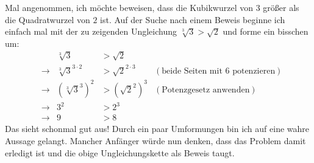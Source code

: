 \begin{bem} \label{hintennachvorne}
    Mal angenommen, ich möchte beweisen, dass die Kubikwurzel von $3$ größer als die Quadratwurzel von $2$ ist. Auf der Suche nach einem Beweis beginne ich einfach mal mit der zu zeigenden Ungleichung $\sqrt[3]{3}>\sqrt{2}$ und forme ein bisschen um:
    \begin{align*}
        && \sqrt[3]{3}& >\sqrt{2} \\
        & \to& \sqrt[3]{3}^{3\cdot 2} & > \sqrt{2}^{2\cdot 3} & (\text{beide Seiten mit $6$ potenzieren}) \\
        & \to & (\sqrt[3]{3}^3)^2 & > (\sqrt{2}^2)^3 & (\text{Potenzgesetz anwenden})\\
        & \to & 3^2 & > 2^3 \\
        & \to & 9 & > 8
    \end{align*}
    Das sieht schonmal gut aus! Durch ein paar Umformungen bin ich auf eine wahre Aussage gelangt. Mancher Anfänger würde nun denken, dass das Problem damit erledigt ist und die obige Ungleichungskette als Beweis taugt.
    

\end{bem}
